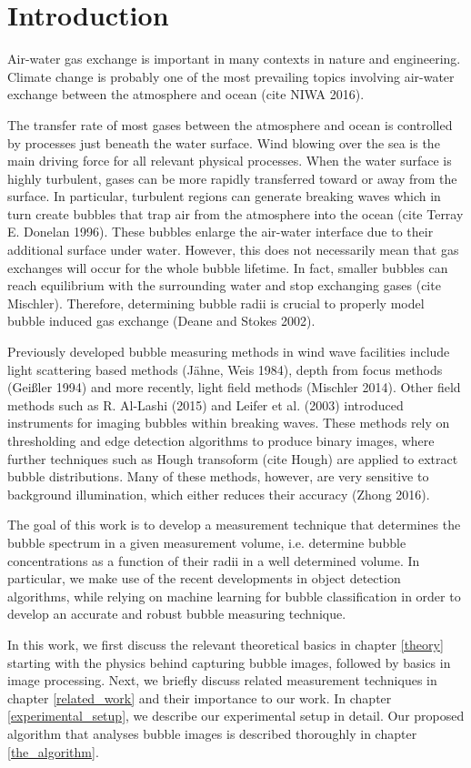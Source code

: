 \chapter{Introduction}
	Air-water gas exchange is important in many contexts in nature and engineering. Climate change is probably one of the most prevailing topics involving air-water exchange between the atmosphere and ocean (cite NIWA 2016). 
	
	The transfer rate of most gases between the atmosphere and ocean is controlled by processes just beneath the water surface. Wind blowing over the sea is the main driving force for all relevant physical processes. 
	When the water surface is highly turbulent, gases can be more rapidly transferred toward or away from the surface. In particular, turbulent regions can generate breaking waves which in turn create bubbles that trap air from the atmosphere into the ocean (cite Terray E. Donelan 1996). These bubbles enlarge the air-water interface due to their additional surface under water. However, this does not necessarily mean that gas exchanges will occur for the whole bubble lifetime. In fact, smaller bubbles can reach equilibrium with the surrounding water and stop exchanging gases (cite Mischler). Therefore, determining bubble radii is crucial to properly model bubble induced gas exchange (Deane and Stokes 2002).
	
	Previously developed bubble measuring methods in wind wave facilities include light scattering based methods (Jähne, Weis 1984), depth from focus methods (Geißler 1994) and more recently, light field methods (Mischler 2014). Other field methods such as R. Al-Lashi (2015) and Leifer et al. (2003) introduced instruments for imaging bubbles within breaking waves. These methods rely on thresholding and edge detection algorithms to produce binary images, where further techniques such as Hough transoform (cite Hough) are applied to extract bubble distributions. Many of these methods, however, are very sensitive to background illumination, which either reduces their accuracy (Zhong 2016). 
	
	The goal of this work is to develop a measurement technique that determines the bubble spectrum in a given measurement volume, i.e. determine bubble concentrations as a function of their radii in a well determined volume. In particular, we make use of the recent developments in object detection algorithms, while relying on machine learning for bubble classification in order to develop an accurate and robust bubble measuring technique. 
	
	In this work, we first discuss the relevant theoretical basics in chapter \ref{theory} starting with the physics behind capturing bubble images, followed by basics in image processing. Next, we briefly discuss related measurement techniques in chapter \ref{related_work} and their importance to our work. In chapter \ref{experimental_setup}, we describe our experimental setup in detail. Our proposed algorithm that analyses bubble images is described thoroughly in chapter \ref{the_algorithm}. 
